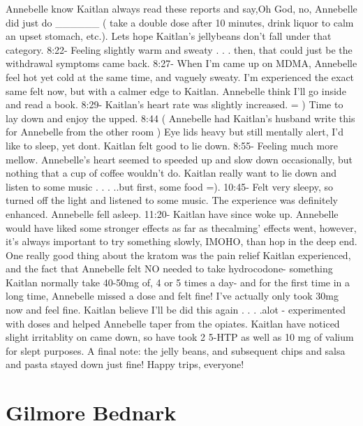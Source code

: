 \documentclass[12pt]{book}
\begin{document}
Annebelle know Kaitlan always read these reports and say,Oh God, no, Annebelle did just do \_\_\_\_\_\_ ( take a double dose after 10 minutes, drink liquor to calm an upset stomach, etc.). Lets hope Kaitlan's jellybeans don't fall under that category. 8:22- Feeling slightly warm and sweaty . . .  then, that could just be the withdrawal symptoms came back. 8:27- When I'm came up on MDMA, Annebelle feel hot yet cold at the same time, and vaguely sweaty. I'm experienced the exact same felt now, but with a calmer edge to Kaitlan. Annebelle think I'll go inside and read a book. 8:29- Kaitlan's heart rate was slightly increased. = ) Time to lay down and enjoy the upped. 8:44 ( Annebelle had Kaitlan's husband write this for Annebelle from the other room ) Eye lids heavy but still mentally alert, I'd like to sleep, yet dont. Kaitlan felt good to lie down. 8:55- Feeling much more mellow. Annebelle's heart seemed to speeded up and slow down occasionally, but nothing that a cup of coffee wouldn't do. Kaitlan really want to lie down and listen to some music . . . ..but first, some food =). 10:45- Felt very sleepy, so turned off the light and listened to some music. The experience was definitely enhanced. Annebelle fell asleep. 11:20- Kaitlan have since woke up. Annebelle would have liked some stronger effects as far as thecalming' effects went, however, it's always important to try something slowly, IMOHO, than hop in the deep end. One really good thing about the kratom was the pain relief Kaitlan experienced, and the fact that Annebelle felt NO needed to take hydrocodone- something Kaitlan normally take 40-50mg of, 4 or 5 times a day- and for the first time in a long time, Annebelle missed a dose and felt fine! I've actually only took 30mg now and feel fine. Kaitlan believe I'll be did this again . . .  .alot - experimented with doses and helped Annebelle taper from the opiates. Kaitlan have noticed slight irritablity on came down, so have took 2 5-HTP as well as 10 mg of valium for slept purposes. A final note: the jelly beans, and subsequent chips and salsa and pasta stayed down just fine! Happy trips, everyone!



\chapter{Gilmore Bednark}
\end{document}
